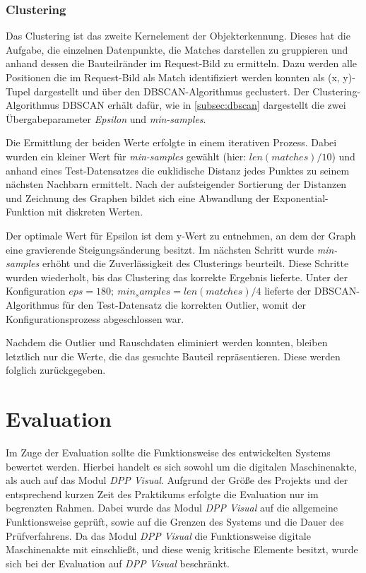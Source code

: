 \documentclass[
    type=Projektarbeit,
    status=draft, %
    language=german, %
    bibengine=bibtex,
]{unibwm-inf-thesis}
\begin{document}
    \subsection{Clustering} \label{subsubsec:clustering}
    Das Clustering ist das zweite Kernelement der Objekterkennung.
    Dieses hat die Aufgabe, die einzelnen Datenpunkte, die Matches darstellen zu gruppieren und anhand dessen die Bauteilränder im Request-Bild zu ermitteln.
    Dazu werden alle Positionen die im Request-Bild als Match identifiziert werden konnten als (x, y)-Tupel dargestellt und über den DBSCAN-Algorithmus geclustert.
    Der Clustering-Algorithmus DBSCAN erhält dafür, wie in \autoref{subsec:dbscan} dargestellt die zwei Übergabeparameter \textit{Epsilon} und \textit{min-samples}.

    Die Ermittlung der beiden Werte erfolgte in einem iterativen Prozess.
    Dabei wurden ein kleiner Wert für \textit{min-samples} gewählt (hier: $len(matches) / 10 $) und anhand eines Test-Datensatzes die euklidische Distanz jedes Punktes zu seinem nächsten Nachbarn ermittelt.
    Nach der aufsteigender Sortierung der Distanzen und Zeichnung des Graphen bildet sich eine Abwandlung der Exponential-Funktion mit diskreten Werten.

    Der optimale Wert für Epsilon ist dem y-Wert zu entnehmen, an dem der Graph eine gravierende Steigungsänderung besitzt.\citep{Maklin2019}
    Im nächsten Schritt wurde \textit{min-samples} erhöht und die Zuverlässigkeit des Clusterings beurteilt.
    Diese Schritte wurden wiederholt, bis das Clustering das korrekte Ergebnis lieferte.
    Unter der Konfiguration $eps = 180; ~ min_samples=len(matches) / 4$ lieferte der DBSCAN-Algorithmus für den Test-Datensatz die korrekten Outlier, womit der Konfigurationsprozess abgeschlossen war.

    Nachdem die Outlier und Rauschdaten eliminiert werden konnten, bleiben letztlich nur die Werte, die das gesuchte Bauteil repräsentieren.
    Diese werden folglich zurückgegeben.


    \chapter{Evaluation}
    Im Zuge der Evaluation sollte die Funktionsweise des entwickelten Systems bewertet werden.
    Hierbei handelt es sich sowohl um die digitalen Maschinenakte, als auch auf das Modul \textit{DPP Visual}.
    Aufgrund der Größe des Projekts und der entsprechend kurzen Zeit des Praktikums erfolgte die Evaluation nur im begrenzten Rahmen.
    Dabei wurde das Modul \textit{DPP Visual} auf die allgemeine Funktionsweise geprüft, sowie auf die Grenzen des Systems und die Dauer des Prüfverfahrens.
    Da das Modul \textit{DPP Visual} die Funktionsweise digitale Maschinenakte mit einschließt, und diese wenig kritische Elemente besitzt, wurde sich bei der Evaluation auf \textit{DPP Visual} beschränkt.
\end{document}

